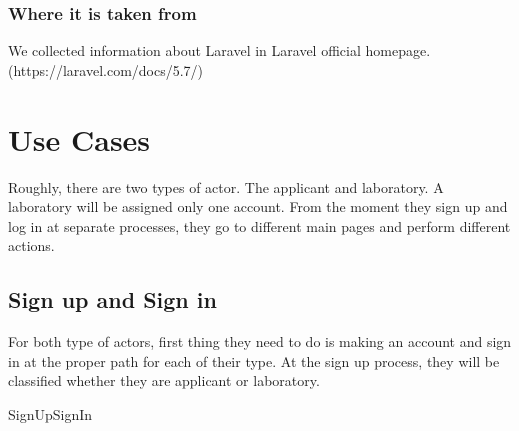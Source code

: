 \documentclass[letterpaper, 10 pt, conference]{ieeeconf}  %
\begin{document}
\subsubsection{Where it is taken from}
We collected information about Laravel in Laravel official homepage.\newline(https://laravel.com/docs/5.7/)





\section{Use Cases}

\begin{center}
\end{center}
Roughly, there are two types of actor. The applicant and laboratory. A laboratory will be assigned only one account. From the moment they sign up and log in at separate processes, they go to different main pages and perform different actions. 

\subsection{Sign up and Sign in}
For both type of actors, first thing they need to do is making an account and sign in at the proper path for each of their type. At the sign up process, they will be classified whether they are applicant or laboratory.\\

SignUpSignIn\\
\end{document}
